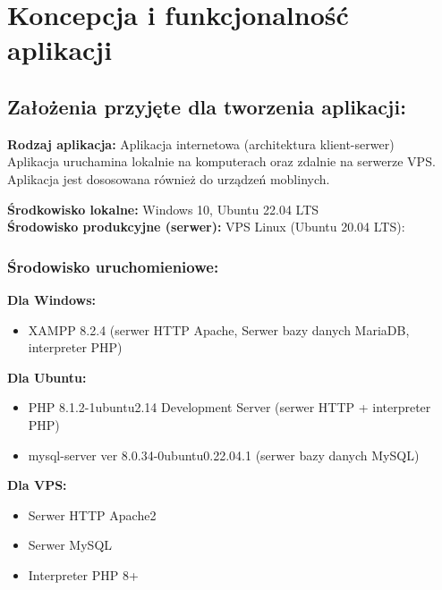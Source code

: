 \section{Koncepcja i funkcjonalność aplikacji}

\subsection{Założenia przyjęte dla tworzenia aplikacji:}
    \begin{flushleft}

        \textbf{Rodzaj aplikacja:} Aplikacja internetowa (architektura klient-serwer) \\

        Aplikacja uruchamina lokalnie na komputerach oraz zdalnie na serwerze VPS. \\
        Aplikacja jest dososowana również do urządzeń moblinych. \newline\newline

        \textbf{Środkowisko lokalne:} Windows 10, Ubuntu 22.04 LTS \\
        \textbf{Środowisko produkcyjne (serwer):} VPS Linux (Ubuntu 20.04 LTS): \\ 

        \subsubsection{Środowisko uruchomieniowe:}

        \textbf{Dla Windows:}
        \begin{itemize}
            \item XAMPP 8.2.4 (serwer HTTP Apache, Serwer bazy danych MariaDB, interpreter PHP)
        \end{itemize}
            
        \textbf{Dla Ubuntu:}
        \begin{itemize}
            \item PHP 8.1.2-1ubuntu2.14 Development Server (serwer HTTP + interpreter PHP)
            \item mysql-server  ver 8.0.34-0ubuntu0.22.04.1 (serwer bazy danych MySQL)
        \end{itemize}

        \textbf{Dla VPS:}
        \begin{itemize}
            \item Serwer HTTP Apache2
            \item Serwer MySQL
            \item Interpreter PHP 8+
        \end{itemize}
        
    \end{flushleft}

